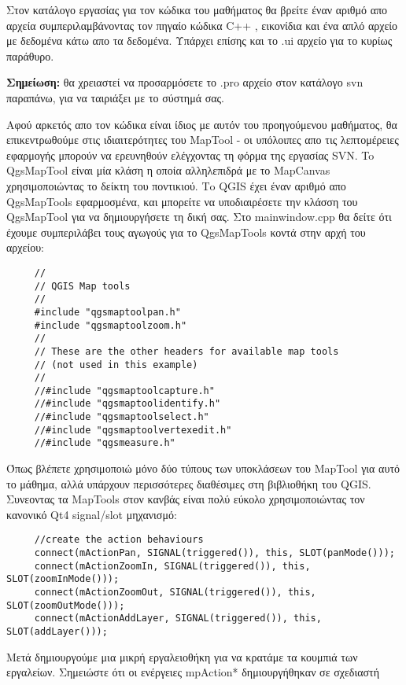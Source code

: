 Στον κατάλογο εργασίας για τον κώδικα του μαθήματος θα βρείτε έναν αριθμό απο αρχεία συμπεριλαμβάνοντας τον πηγαίο κώδικα C++ , εικονίδια και ένα απλό αρχείο με δεδομένα κάτω απο τα δεδομένα.  Υπάρχει επίσης και το .ui αρχείο για το κυρίως παράθυρο. 

\textbf{Σημείωση:} θα χρειαστεί να προσαρμόσετε το .pro αρχείο στον κατάλογο svn παραπάνω, για να ταιριάξει με το σύστημά σας. 

Αφού αρκετός απο τον κώδικα είναι ίδιος με αυτόν του προηγούμενου μαθήματος, θα επικεντρωθούμε στις ιδιαιτερότητες του MapTool -  οι υπόλοιπες απο τις λεπτομέρειες εφαρμογής μπορούν να ερευνηθούν ελέγχοντας τη φόρμα της εργασίας SVN. To QgsMapTool είναι μία κλάση η οποία αλληλεπιδρά με το MapCanvas χρησιμοποιώντας το δείκτη του ποντικιού. Τo QGIS έχει έναν αριθμό απο QgsMapTools εφαρμοσμένα, και μπορείτε να υποδιαιρέσετε την κλάσση του QgsMapTool για να δημιουργήσετε τη δική σας. Στο mainwindow.cpp θα δείτε ότι έχουμε συμπεριλάβει τους αγωγούς για το QgsMapTools κοντά στην αρχή του αρχείου: 

\begin{verbatim}
     //
     // QGIS Map tools
     //
     #include "qgsmaptoolpan.h"
     #include "qgsmaptoolzoom.h"
     //
     // These are the other headers for available map tools 
     // (not used in this example)
     //
     //#include "qgsmaptoolcapture.h"
     //#include "qgsmaptoolidentify.h"
     //#include "qgsmaptoolselect.h"
     //#include "qgsmaptoolvertexedit.h"
     //#include "qgsmeasure.h"
\end{verbatim}

Όπως βλέπετε χρησιμοποιώ μόνο δύο τύπους των υποκλάσεων του MapTool για αυτό το μάθημα, αλλά υπάρχουν περισσότερες διαθέσιμες στη βιβλιοθήκη του QGIS. Συνεοντας τα MapTools στον κανβάς είναι πολύ εύκολο χρησιμοποιώντας τον κανονικό Qt4 signal/slot μηχανισμό: 

\begin{verbatim}
     //create the action behaviours
     connect(mActionPan, SIGNAL(triggered()), this, SLOT(panMode()));
     connect(mActionZoomIn, SIGNAL(triggered()), this, SLOT(zoomInMode()));
     connect(mActionZoomOut, SIGNAL(triggered()), this, SLOT(zoomOutMode()));
     connect(mActionAddLayer, SIGNAL(triggered()), this, SLOT(addLayer()));
\end{verbatim}

Μετά δημιουργούμε μια μικρή εργαλειοθήκη για να κρατάμε τα κουμπιά των εργαλείων. Σημειώστε ότι οι ενέργειες mpAction*  δημιουργήθηκαν σε σχεδιαστή 

